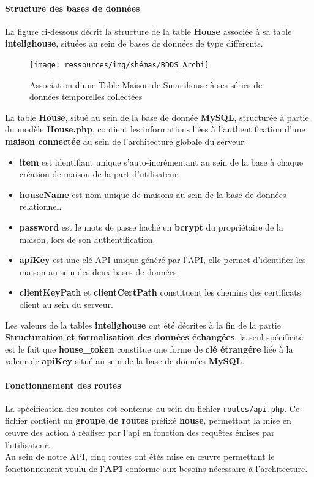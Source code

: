 \documentclass[10pt, a4paper]{report}
\begin{document}
	\paragraph{Structure des bases de données} La figure ci-dessous décrit la structure de la table \textbf{House} associée à sa table \textbf{intelighouse}, situées au sein de bases de données de type différents.
		\begin{figure}[h!]
			\centering
			\texttt{[image: ressources/img/shémas/BDDS\_Archi]}
			\caption{Association d'une Table Maison de Smarthouse à ses séries de données temporelles collectées}
		\label{fig:archBDDs}
		\end{figure}
		
		La table \textbf{House}, situé au sein de la base de donnée \textbf{MySQL}, structurée à partie du modèle \textbf{House.php}, contient les informations liées à l'authentification d'une \textbf{maison connectée} au sein de l'architecture globale du serveur:
		\begin{itemize}
			\item \textbf{item} est identifiant unique s'auto-incrémentant au sein de la base à chaque création de maison de la part d'utilisateur.
			\item \textbf{houseName} est nom unique de maisons au sein de la base de données relationnel.
			\item \textbf{password} est le mots de passe haché en \textbf{bcrypt} du propriétaire de la maison, lors de son authentification.
			\item \textbf{apiKey} est une clé API unique généré par l'API, elle permet d'identifier les maison au sein des deux bases de données. 
			\item \textbf{clientKeyPath} et \textbf{clientCertPath} constituent les chemins des certificats client au sein du serveur.
		\end{itemize}
		Les valeurs de la tables \textbf{intelighouse} ont été décrites à la fin de la partie \textbf{Structuration et formalisation des données échangées}, la seul spécificité est le fait que \textbf{house\_token} constitue une forme de \textbf{clé étrangére} liée à la valeur de \textbf{apiKey} situé au sein de la base de données \textbf{MySQL}.
		
	\paragraph{Fonctionnement des routes}
	La spécification des routes est contenue au sein du fichier \texttt{routes/api.php}. Ce fichier contient un \textbf{groupe de routes} préfixé \textbf{house}, permettant la mise en œuvre des action à réaliser par l'api en fonction des requêtes émises par l'utilisateur.\\
	Au sein de notre API, cinq routes ont étés mise en œuvre permettant le fonctionnement voulu de l'\textbf{API} conforme aux besoins nécessaire à l'architecture.
	
\end{document}
